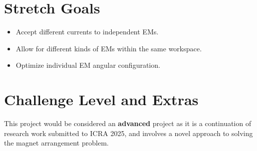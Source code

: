 \documentclass{article}
\begin{document}
\section{Stretch Goals}
\begin{itemize}
    \item Accept different currents to independent EMs. 
    \item Allow for different kinds of EMs within the same workspace.
    \item Optimize individual EM angular configuration. 
\end{itemize}

\section{Challenge Level and Extras}
This project would be considered an \textbf{advanced} project as it is a continuation of research work submitted to ICRA 2025, and involves a novel approach to solving the magnet arrangement problem. 
\end{document}
